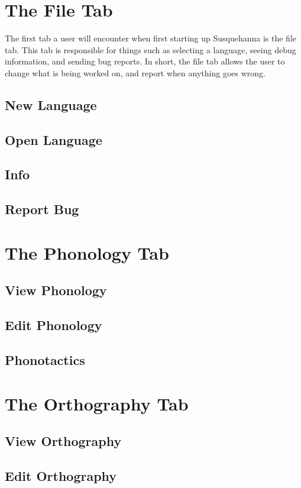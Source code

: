 \documentclass{report}
\begin{document}
	\chapter{The File Tab}
	The first tab a user will encounter when first starting up Susquehanna is the file tab. This tab is responsible
	for things such as selecting a language, seeing debug information, and sending bug reports. In short, the file tab
	allows the user to change what is being worked on, and report when anything goes wrong.
	\section{New Language}
	\section{Open Language}
	\section{Info}
	\section{Report Bug}
	
	\chapter{The Phonology Tab}
	\section{View Phonology}
	\section{Edit Phonology}
	\section{Phonotactics}
	
	\chapter{The Orthography Tab}
	\section{View Orthography}
	\section{Edit Orthography}
\end{document}
